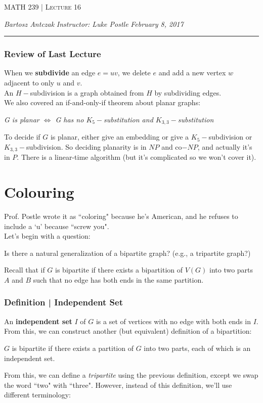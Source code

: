 \documentclass{report}
\newcommand{\lectureNum}{16}
\newcommand{\curDate}{February 8, 2017}
\newcommand{\course}{MATH 239}
\newcommand{\instructor}{Luke Postle}
\begin{document}
\begin{center}
\begin{Large}
\textsc{\course{} | Lecture \lectureNum{}}
\end{Large}
\end{center} 
\noindent \textit{Bartosz Antczak} \hfill
\textit{Instructor: \instructor{}} \hfill
\textit{\curDate{}}
\rule{\textwidth}{0.4pt}

\subsubsection{Review of Last Lecture}
When we \textbf{subdivide} an edge $e=uv$, we delete $e$ and add a new vertex $w$ adjacent to only $u$ and $v$.\\An $H-$subdivision is a graph obtained from $H$ by subdividing edges.\\We also covered an if-and-only-if theorem about planar graphs:
\begin{center}
\textit{G is planar $\iff$ G has no $K_5-$substitution and $K_{3,3}-$substitution}
\end{center}
To decide if $G$ is planar, either give an embedding or give a $K_5-$subdivision or $K_{3,3}-$subdivision. So deciding planarity is in $NP$ and co$-NP$, and actually it's in $P$. There is a linear-time algorithm (but it's complicated so we won't cover it).
\section{Colouring}
Prof. Postle wrote it as ``coloring" because he's American, and he refuses to include a `u' because ``screw you".\\
Let's begin with a question:
\begin{center}
Is there a natural generalization of a bipartite graph? (e.g., a tripartite  graph?)
\end{center}
Recall that if $G$ is bipartite if there exists a bipartition of $V(G)$ into two parts $A$ and $B$ such that no edge has both ends in the same partition.
\subsubsection{Definition | Independent Set}
An \textbf{independent set} $I$ of $G$ is a set of vertices with no edge with both ends in $I$. From this, we can construct another (but equivalent) definition of a bipartition:
\begin{center}
$G$ is bipartite if there exists a partition of $G$ into two parts, each of which is an independent set.
\end{center}
From this, we can define a \textit{tripartite} using the previous definition, except we swap the word ``two" with ``three". However, instead of this definition, we'll use different terminology:
\end{document}
